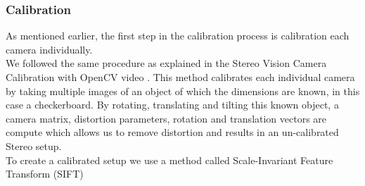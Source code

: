\documentclass{article}[a4paper]
\begin{document}
\subsubsection{Calibration}
As mentioned earlier, the first step in the calibration process is calibration each camera individually.
\\We followed the same procedure as explained in the Stereo Vision Camera Calibration with OpenCV video \cite{youtube}. This method calibrates each individual camera by taking multiple images of an object of which the dimensions are known, in this case a checkerboard. By rotating, translating and tilting this known object, a camera matrix, distortion parameters, rotation and translation vectors are compute which allows us to remove distortion and results in an un-calibrated Stereo setup.
\\ To create a calibrated setup we use a method called Scale-Invariant Feature Transform (SIFT) 
\end{document}
